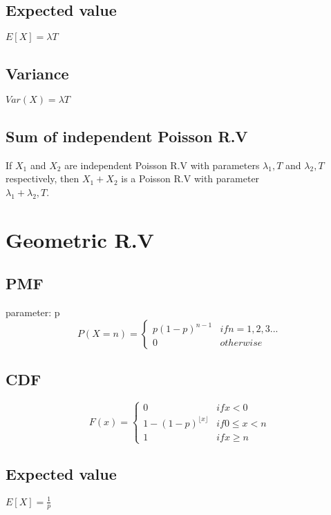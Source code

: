     \subsection*{Expected value}
        $E[X] = \lambda T$

    \subsection*{Variance}
        $Var(X)=\lambda T$

    \subsection*{Sum of independent Poisson R.V}
        If $X_1$ and $X_2$ are independent Poisson R.V with parameters $\lambda_1, T$ and $\lambda_2, T$ respectively, then $X_1 + X_2$ is a Poisson R.V with parameter \\ $\lambda_1 + \lambda_2, T$.

\section{Geometric R.V}
    \subsection*{PMF}
        parameter: p
        \begin{equation*}
            P(X=n)=
            \begin{cases}
                p(1-p)^{n-1} & if n = 1,2,3... \\
                0 & otherwise
            \end{cases}
        \end{equation*}

    \subsection*{CDF}
        \begin{equation*}
            F(x)=
            \begin{cases}
                0 & if x < 0 \\
                1-(1-p)^{\lfloor x \rfloor} & if 0 \leq x < n \\
                1 & if x \geq n
            \end{cases}
        \end{equation*}


    \subsection*{Expected value}
        $E[X] = \frac{1}{p}$

